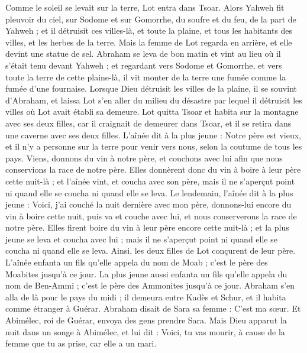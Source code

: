 \begin{multicols}{2}
Comme le soleil se levait sur la terre, Lot entra dans Tsoar.
Alors Yahweh fit pleuvoir du ciel, sur Sodome et sur Gomorrhe, du soufre et du feu, de la part de Yahweh ;
et il détruisit ces villes-là, et toute la plaine, et tous les habitants des villes, et les herbes de la terre.
Mais la femme de Lot regarda en arrière, et elle devint une statue de sel.
Abraham se leva de bon matin et vint au lieu où il s'était tenu devant Yahweh ;
et regardant vers Sodome et Gomorrhe, et vers toute la terre de cette plaine-là, il vit monter de la terre une fumée comme la fumée d'une fournaise.
Lorsque Dieu détruisit les villes de la plaine, il se souvint d'Abraham, et laissa Lot s’en aller  du milieu du désastre par lequel il détruisit les villes où Lot avait établi sa demeure.
Lot quitta Tsoar et habita sur la montagne avec ses deux filles, car il craignait de demeurer dans Tsoar, et il se retira dans une caverne avec ses deux filles.
L'aînée dit à la plus jeune : Notre père est vieux, et il n'y a personne sur la terre pour venir vers nous, selon la coutume de tous les pays.
Viens, donnons du vin à notre père, et couchons avec lui  afin que nous conservions la race de notre père.
Elles donnèrent donc du vin à boire à leur père cette nuit-là ; et l'aînée vint, et coucha avec son père, mais il ne s'aperçut point ni quand elle se coucha ni quand elle se leva.
Le lendemain, l'aînée dit à la plus jeune : Voici, j'ai couché la nuit dernière avec mon père, donnons-lui encore du vin à boire cette nuit, puis va et couche avec lui, et nous conserverons la race de notre père.
Elles firent boire du vin à leur père encore cette nuit-là ; et la plus jeune se leva et coucha avec lui ; mais il ne s'aperçut point ni quand elle se coucha ni quand elle se leva.
Ainsi, les deux filles de Lot conçurent de leur père.
L’aînée enfanta un fils qu’elle appela du nom de Moab ; c'est le père des Moabites jusqu'à ce jour.
La plus jeune aussi enfanta un fils qu’elle appela du nom de Ben-Ammi ; c'est le père des Ammonites jusqu'à ce jour.
\VerseOne{}Abraham s'en alla de là pour le pays du midi ; il demeura entre Kadès et Schur, et il habita comme étranger à Guérar.
Abraham disait de Sara sa femme : C'est ma sœur. Et Abimélec, roi de Guérar, envoya des gens prendre Sara.
Mais Dieu apparut la nuit dans un songe à Abimélec, et lui dit : Voici, tu vas mourir, à cause de la femme que tu as prise, car elle a un mari.

\end{multicols}
